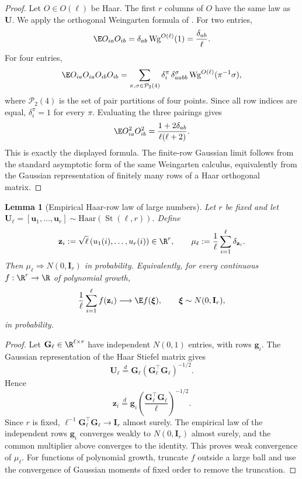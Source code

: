 \documentclass{article}
\newcommand{\St}{\operatorname{St}}
\newcommand{\weak}{\Rightarrow}
\newcommand{\bU}{\mathbf{U}}
\newcommand{\bu}{\mathbf{u}}
\newcommand{\bG}{\mathbf{G}}
\newtheorem{lemma}[theorem]{Lemma}
\theoremstyle{remark}
\begin{document}
\begin{proof}
Let $O\in O(\ell)$ be Haar.  The first $r$ columns of $O$ have the same law as
$\bU$.  We apply the orthogonal Weingarten formula of
\citet{collins:2006integration}.  For two entries,
\[
    \E O_{ia}O_{ib}
    =
    \delta_{ab}\,\mathrm{Wg}^{O(\ell)}(1)
    =
    \frac{\delta_{ab}}{\ell}.
\]
For four entries,
\[
    \E O_{ia}O_{ia}O_{ib}O_{ib}
    =
    \sum_{\pi,\sigma\in\mathcal P_2(4)}
    \delta_i^\pi\,\delta_{aabb}^{\sigma}\,
    \mathrm{Wg}^{O(\ell)}(\pi^{-1}\sigma),
\]
where $\mathcal P_2(4)$ is the set of pair partitions of four points.  Since all
row indices are equal, $\delta_i^\pi=1$ for every $\pi$.  Evaluating the three
pairings gives
\[
    \E O_{ia}^2O_{ib}^2
    =
    \frac{1+2\delta_{ab}}{\ell(\ell+2)}.
\]
This is exactly the displayed formula.  The finite-row Gaussian limit follows
from the standard asymptotic form of the same Weingarten calculus, equivalently
from the Gaussian representation of finitely many rows of a Haar orthogonal
matrix.
\end{proof}

\begin{lemma}[Empirical Haar-row law of large numbers]
Let $r$ be fixed and let
$\bU_\ell=[\bu_1,\ldots,\bu_r]\sim\mathrm{Haar}(\St(\ell,r))$.  Define
\[
    \mathbf z_i
    :=
    \sqrt\ell\,(u_1(i),\ldots,u_r(i))\in\R^r,
    \qquad
    \mu_\ell
    :=
    \frac1\ell\sum_{i=1}^{\ell}\delta_{\mathbf z_i}.
\]
Then $\mu_\ell\weak N(0,\mathbf I_r)$ in probability.  Equivalently, for every
continuous $f:\R^r\to\R$ of polynomial growth,
\[
    \frac1\ell\sum_{i=1}^{\ell}f(\mathbf z_i)
    \longrightarrow
    \E f(\boldsymbol{\xi}),
    \qquad
    \boldsymbol{\xi}\sim N(0,\mathbf I_r),
\]
in probability.
\label{lem:empirical-haar-row}
\end{lemma}

\begin{proof}
Let $\bG_\ell\in\R^{\ell\times r}$ have independent $N(0,1)$ entries, with rows
$\mathbf g_i$.  The Gaussian representation of the Haar Stiefel matrix gives
\[
    \bU_\ell
    \stackrel{d}{=}
    \bG_\ell(\bG_\ell^\top\bG_\ell)^{-1/2}.
\]
Hence
\[
    \mathbf z_i
    \stackrel{d}{=}
    \mathbf g_i
    \left(\frac{\bG_\ell^\top\bG_\ell}{\ell}\right)^{-1/2}.
\]
Since $r$ is fixed,
$\ell^{-1}\bG_\ell^\top\bG_\ell\to\mathbf I_r$ almost surely.  The empirical
law of the independent rows $\mathbf g_i$ converges weakly to
$N(0,\mathbf I_r)$ almost surely, and the common multiplier above converges to
the identity.  This proves weak convergence of $\mu_\ell$.  For functions of
polynomial growth, truncate $f$ outside a large ball and use the convergence of
Gaussian moments of fixed order to remove the truncation.
\end{proof}
\end{document}
